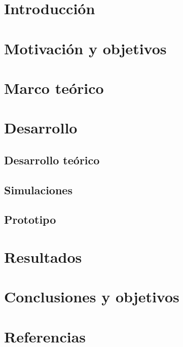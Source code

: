 \documentclass[a4paper,12pt]{article}
\begin{document}
\newpage
\thispagestyle{plain}
\section{Introducción}

\newpage
\thispagestyle{plain}
\section{Motivación y objetivos}

\newpage
\thispagestyle{plain}
\section{Marco teórico}

\newpage
\thispagestyle{plain}
\section{Desarrollo}

\newpage
\thispagestyle{plain}
\subsection{Desarrollo teórico}

\newpage
\thispagestyle{plain}
\subsection{Simulaciones}

\newpage
\thispagestyle{plain}
\subsection{Prototipo}

\newpage
\thispagestyle{plain}
\section{Resultados}

\newpage
\thispagestyle{plain}
\section{Conclusiones y objetivos}

\newpage
\thispagestyle{plain}
\section{Referencias}
\end{document}
